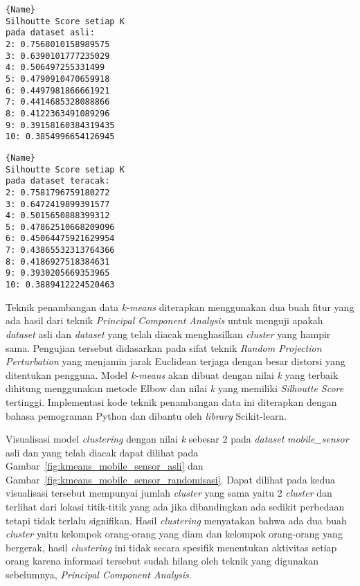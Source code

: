 \noindent\begin{minipage}{.48\textwidth}
\begin{lstlisting}[caption=\textit{Dataset mobile\_sensor} Asli,frame=tlrb, label=mobile_sensor_siluet_asli]{Name}
Silhoutte Score setiap K
pada dataset asli: 
2: 0.7568010158989575
3: 0.6390101777235029
4: 0.506497255331499
5: 0.4790910470659918
6: 0.4497981866661921
7: 0.4414685328088866
8: 0.4122363491089296
9: 0.39158160384319435
10: 0.3854996654126945
\end{lstlisting}
\end{minipage}\hfill
\begin{minipage}{.48\textwidth}
\begin{lstlisting}[caption=\textit{Dataset mobile\_sensor} Teracak,frame=tlrb, label=mobile_sensor_siluet_randomisasi]{Name}
Silhoutte Score setiap K
pada dataset teracak: 
2: 0.7581796759180272
3: 0.6472419899391577
4: 0.5015650888399312
5: 0.47862510668209096
6: 0.45064475921629954
7: 0.43865532313764366
8: 0.4186927518384631
9: 0.3930205669353965
10: 0.3889412224520463
\end{lstlisting}
\end{minipage}

Teknik penambangan data \textit{k-means} diterapkan menggunakan dua buah fitur yang ada hasil dari teknik \textit{Principal Component Analysis} untuk menguji apakah \textit{dataset} asli dan \textit{dataset} yang telah diacak menghasilkan \textit{cluster} yang hampir sama. Pengujian tersebut didasarkan pada sifat teknik \textit{Random Projection Perturbation} yang menjamin jarak Euclidean terjaga dengan besar distorsi yang ditentukan pengguna. Model \textit{k-means} akan dibuat dengan nilai \textit{k} yang terbaik dihitung menggunakan metode Elbow dan nilai \textit{k} yang memiliki \textit{Silhoutte Score} tertinggi. Implementasi kode teknik penambangan data ini diterapkan dengan bahasa pemograman Python dan dibantu oleh \textit{library} Scikit-learn. 

Visualisasi model \textit{clustering} dengan nilai \textit{k} sebesar 2 pada \textit{dataset} \textit{mobile\_sensor} asli dan yang telah diacak dapat dilihat pada Gambar~\ref{fig:kmeans_mobile_sensor_asli} dan Gambar~\ref{fig:kmeans_mobile_sensor_randomisasi}. Dapat dilihat pada kedua visualisasi tersebut mempunyai jumlah \textit{cluster} yang sama yaitu 2 \textit{cluster} dan terlihat dari lokasi titik-titik yang ada jika dibandingkan ada sedikit perbedaan tetapi tidak terlalu signifikan. Hasil \textit{clustering} menyatakan bahwa ada dua buah \textit{cluster} yaitu kelompok orang-orang yang diam dan kelompok orang-orang yang bergerak, hasil \textit{clustering} ini tidak secara spesifik menentukan aktivitas setiap orang karena informasi tersebut sudah hilang oleh teknik yang digunakan sebelumnya, \textit{Principal Component Analysis}. 
	
